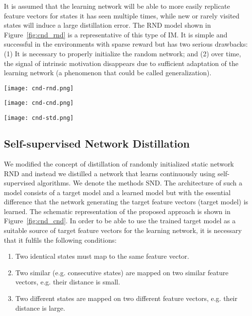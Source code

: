 \documentclass[a4paper,11pt]{elsarticle}
\begin{document}
It is assumed that the learning network will be able to more easily replicate feature vectors for states it has seen multiple times, while new or rarely visited states will induce a large distillation error.
The RND \citep{burda2018exploration} model shown in Figure~\ref{fig:cnd_rnd} is a representative of this type of IM.
It is simple and successful in the environments with sparse reward but has two serious drawbacks: (1) It is necessary to properly initialize the random network; and (2) over time, the signal of intrinsic motivation disappears due to sufficient adaptation of the learning network (a phenomenon that could be called generalization).

\begin{figure*}[thb]
  \centering
  \texttt{[image: cnd-rnd.png]}
  \caption{The basic principle of generating an exploration signal in random network distillation.}
\label{fig:cnd_rnd}
\end{figure*}

\begin{figure*}[ht]
\centering
  \texttt{[image: cnd-cnd.png]}
  \caption{The basic principle of generating an exploration signal in the regularized target model followed by RND.}
  \label{fig:cnd_cnd}
\end{figure*}

\begin{figure*}[thb]
\centering
\texttt{[image: cnd-std.png]}
\caption{Training of the SND target model using two consecutive states and the self-supervised learning algorithm.}
\label{fig:std_dim_idea}
\end{figure*}


\subsection{Self-supervised Network Distillation}

We modified the concept of distillation of randomly initialized static network RND \citep{burda2018exploration} and instead we distilled a network that learns continuously using self-supervised algorithms. We denote the methods SND. The architecture of such a model consists of a target model  and a learned model  but with the essential difference that the network generating the target feature vectors (target model) is learned. The schematic representation of the proposed approach is shown in Figure~\ref{fig:cnd_cnd}.
In order to be able to use the trained target model as a suitable source of target feature vectors for the learning network, it is necessary that it fulfils the following conditions:
\begin{enumerate}
\item Two identical states must map to the same feature vector.
\item Two similar (e.g. consecutive states) are mapped on two similar feature vectors, e.g. their  distance is small.
\item Two different states are mapped on two different feature vectors, e.g. their  distance is large.
\end{enumerate}
\end{document}
